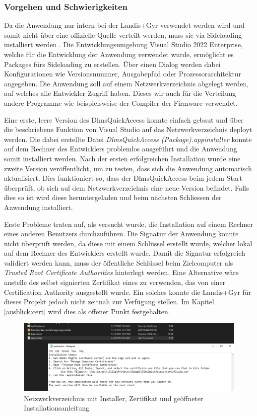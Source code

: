 \subsubsection{Vorgehen und Schwierigkeiten}
Da die Anwendung nur intern bei der Landis+Gyr verwendet werden wird und somit nicht über eine offizielle Quelle verteilt werden, muss sie via Sideloading installiert werden \parencite{sideload}.
Die Entwicklungsumgebung Visual Studio 2022 Enterprise, welche für die Entwicklung der Anwendung verwendet wurde, ermöglicht es Packages fürs Sideloading zu erstellen.
Über einen Dialog werden dabei Konfigurationen wie Versionsnummer, Ausgabepfad oder Prozessorarchitektur angegeben.
Die Anwendung soll auf einem Netzwerkverzeichnis abgelegt werden, auf welches alle Entwickler Zugriff haben.
Dieses wir auch für die Verteilung andere Programme wie beispielsweise der Compiler der Firmware verwendet.

Eine erste, leere Version des DlmsQuickAccess konnte einfach gebaut und über die beschriebene Funktion von Visual Studio auf das Netzwerkverzeichnis deployt werden.
Die dabei erstellte Datei \textit{DlmsQuickAccess (Package).appinstaller} konnte auf dem Rechner des Entwicklers problemlos ausgeführt und die Anwendung somit installiert werden.
Nach der ersten erfolgreichen Installation wurde eine zweite Version veröffentlicht, um zu testen, dass sich die Anwendung automatisch aktualisiert.
Dies funktioniert so, dass der DlmsQuickAccess beim jedem Start überprüft, ob sich auf dem Netzwerkverzeichnis eine neue Version befindet.
Falls dies so ist wird diese heruntergeladen und beim nächsten Schliessen der Anwendung installiert.

Erste Probleme traten auf, als versucht wurde, die Installation auf einem Rechner eines anderen Benutzers durchzuführen.
Die Signatur der Anwendung konnte nicht überprüft werden, da diese mit einem Schlüssel erstellt wurde, welcher lokal auf dem Rechner des Entwicklers erstellt wurde.
Damit die Signatur erfolgreich validiert werden kann, muss der öffentliche Schlüssel beim Zielcomputer als \textit{Trusted Root Certificate Authorities} hinterlegt werden.
Eine Alternative wäre anstelle des selbst signierten Zertifikat eines zu verwenden, das von einer Certification Authority ausgestellt wurde.
Ein solches konnte die Landis+Gyr für dieses Projekt jedoch nicht zeitnah zur Verfügung stellen.
Im Kapitel \ref{ausblick:cert} wird dies als offener Punkt festgehalten.

\begin{figure}
   \centering
   \includegraphics[width=1.0\textwidth]{gfx/installer_readme.png}
   \caption{
      Netzwerkverzeichnis mit Installer, Zertifikat und geöffneter Installationsanleitung
      }
      \label{fig:installerreadme}
\end{figure}

